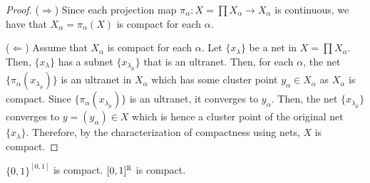 \begin{proof}
    (\(\Rightarrow\)) Since each projection map $\pi_\alpha:X=\prod X_\alpha\to X_\alpha$ is continuous, we have that $X_\alpha=\pi_\alpha(X)$ is compact for each $\alpha$.

    (\(\Leftarrow\)) Assume that $X_\alpha$ is compact for each $\alpha$. Let $\{x_\lambda\}$ be a net in $X=\prod X_\alpha$. Then, $\{x_\lambda\}$ has a subnet $\{x_{\lambda_\mu}\}$ that is an ultranet. Then, for each $\alpha$, the net $\{\pi_\alpha(x_{\lambda_\mu})\}$ is an ultranet in $X_\alpha$ which has some cluster point $y_\alpha\in X_\alpha$ as $X_\alpha$ is compact. Since $\{\pi_\alpha(x_{\lambda_\mu})\}$ is an ultranet, it converges to $y_\alpha$. Then, the net $\{x_{\lambda_\mu}\}$ converges to $y=(y_\alpha)\in X$ which is hence a cluster point of the original net $\{x_\lambda\}$. Therefore, by the characterization of compactness using nets, $X$ is compact.
\end{proof}

\begin{example}
    $\{0,1\}^{[0,1]}$ is compact. $[0,1]^{\mathbb{R}}$ is compact.
\end{example}

